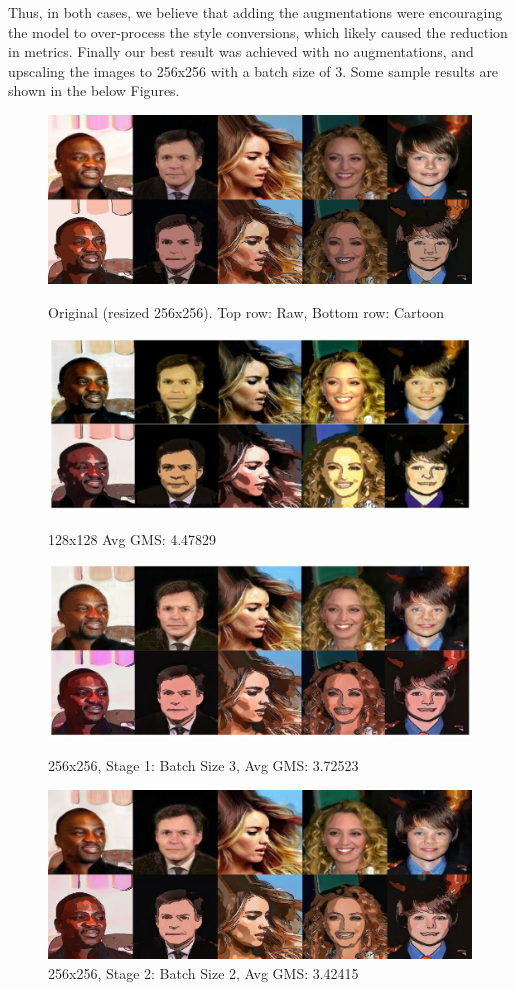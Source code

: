 \documentclass[twoside,english,notitlepage]{report}
\begin{document}
\noindent Thus, in both cases, we believe that adding the augmentations were encouraging the model to over-process the style conversions, which likely caused the reduction in metrics. Finally our best result was achieved with no augmentations, and upscaling the images to 256x256 with a batch size of 3. Some sample results are shown in the below Figures.

\begin{figure}[h]
    \centering
    \includegraphics[width=0.8\linewidth]{task1/originals.jpg}
    \vspace{-10pt}
    \caption{Original (resized 256x256). Top row: Raw, Bottom row: Cartoon}
    \vspace{12pt}
    \includegraphics[width=0.8\linewidth]{task1/top2.jpg}
    \vspace{-10pt}
    \caption{128x128 Avg GMS: 4.47829}
    \vspace{12pt}
    \includegraphics[width=0.8\linewidth]{task1/top1.jpg}
    \vspace{-10pt}
    \caption{256x256, Stage 1: Batch Size 3, Avg GMS: 3.72523}
    \vspace{12pt}
    \includegraphics[width=0.8\linewidth]{task1/top3-3-42.jpg}
    \vspace{-10pt}
    \caption{256x256, Stage 2: Batch Size 2, Avg GMS: 3.42415}
\end{figure}
\end{document}
